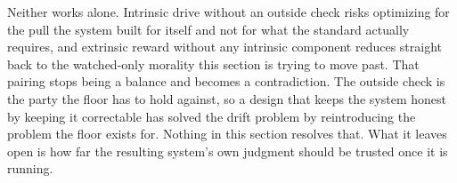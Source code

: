Neither works alone. Intrinsic drive without an outside check risks optimizing for the pull the system built for itself and not for what the standard actually requires, and extrinsic reward without any intrinsic component reduces straight back to the watched-only morality this section is trying to move past. That pairing stops being a balance and becomes a contradiction. The outside check is the party the floor has to hold against, so a design that keeps the system honest by keeping it correctable has solved the drift problem by reintroducing the problem the floor exists for. Nothing in this section resolves that. What it leaves open is how far the resulting system's own judgment should be trusted once it is running.
